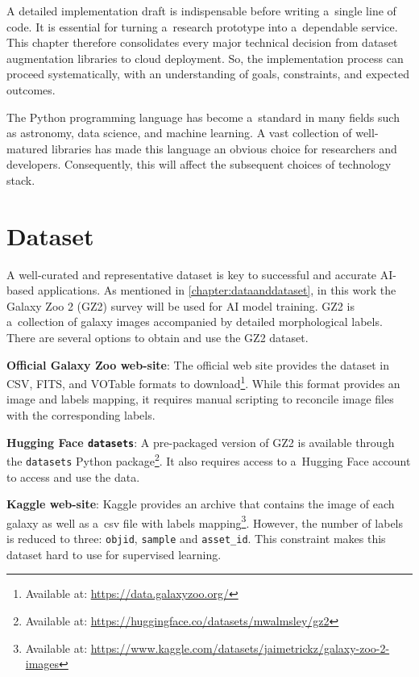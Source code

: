 A detailed implementation draft is indispensable before writing a~single line of code. It is essential for turning a~research prototype into a~dependable service. This chapter therefore consolidates every major technical decision from dataset augmentation libraries to cloud deployment. So, the implementation process can proceed systematically, with an understanding of goals, constraints, and expected outcomes.

The Python programming language has become a~standard in many fields such as astronomy, data science, and machine learning. A vast collection of well-matured libraries has made this language an obvious choice for researchers and developers. Consequently, this will affect the subsequent choices of technology stack.

\section*{Dataset}
\label{sec:dataset_acquisition}

A well-curated and representative dataset is key to successful and accurate AI-based applications. As mentioned in \autoref{chapter:dataanddataset}, in this work the Galaxy Zoo 2 (GZ2) survey will be used for AI model training. GZ2 is a~collection of galaxy images accompanied by detailed morphological labels. There are several options to obtain and use the GZ2 dataset.

\medskip

\textbf{Official Galaxy Zoo web-site}:
The official web site provides the dataset in CSV, FITS, and VOTable formats to download\footnote{Available at: \url{https://data.galaxyzoo.org/}}.
While this format provides an image and labels mapping, it requires manual scripting to reconcile image files with the corresponding labels.

\medskip

\textbf{Hugging Face \texttt{datasets}}:
A pre-packaged version of GZ2 is available through the \texttt{datasets} Python package\footnote{Available at: \url{https://huggingface.co/datasets/mwalmsley/gz2}}. It also requires access to a~Hugging Face account to access and use the data.

\medskip

\textbf{Kaggle web-site}:
Kaggle provides an archive that contains the image of each galaxy as well as a~csv file with labels mapping\footnote{Available at: \url{https://www.kaggle.com/datasets/jaimetrickz/galaxy-zoo-2-images}}. However, the number of labels is reduced to three: \texttt{objid}, \texttt{sample} and \texttt{asset\_id}. This constraint makes this dataset hard to use for supervised learning.

